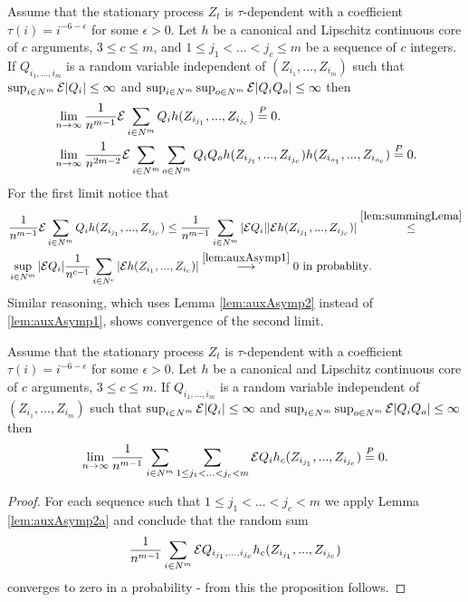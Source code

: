 \begin{lemma}
\label{lem:auxAsymp2a}
Assume that the stationary process $Z_t$ is $\tau$-dependent with a coefficient $\tau(i) = i^{-6-\epsilon}$ for some $\epsilon>0$. Let $h$ be a canonical and Lipschitz continuous core of $c$ arguments, $3 \leq c \leq m$, and $1 \leq j_1 < ...<j_c \leq m$ be a sequence of $c$ integers. If $Q_{i_1,...,i_m}$ is a random variable independent of $(Z_{i_1},...,Z_{i_m})$ such that $\sup_{i \in N^m} \mathcal{E} |Q_i| \leq \infty$ and $\sup_{i \in N^{m}} \sup_{o \in N^m} \mathcal{E} |Q_i Q_o| \leq \infty$  then 
\begin{align}
&\lim_{n \to \infty}\frac{1} {n^{m-1}} \mathcal{E}  \sum_{i \in N^{m}}  Q_i h(Z_{i_{j_1}},...,Z_{i_{j_c}}) \overset{P}{=} 0. \\
&\lim_{n \to \infty}\frac{1} {n^{2m-2}} \mathcal{E}  \sum_{i \in N^{m}} \sum_{o \in N^{m}}  Q_i Q_o h(Z_{i_{j_1}},...,Z_{i_{j_c}}) h(Z_{i_{o_1}},...,Z_{i_{o_c}}) \overset{P}{=} 0. \\
\end{align}
For the first limit notice  that 
\begin{align}
&\frac{1} {n^{m-1}} \mathcal{E}  \sum_{i \in N^{m}}  Q_i h(Z_{i_{j_1}},...,Z_{i_{j_c}}) \leq  \frac{1} {n^{m-1}}  \sum_{i \in N^{m}}  |\mathcal{E} Q_i| |\mathcal{E} h(Z_{i_{j_1}},...,Z_{i_{j_c}})| \overset{ \ref{lem:summingLema}}{\leq} \\
& \sup_{i \in N^m} |\mathcal{E} Q_i|   \frac{1} {n^{c-1}}  \sum_{i \in N^c} |\mathcal{E} h(Z_{i_1},...,Z_{i_c})| \overset{\ref{lem:auxAsymp1}}{\longrightarrow} 0 \text{  in probablity}. 
\end{align}
Similar reasoning, which uses Lemma \ref{lem:auxAsymp2} instead of \ref{lem:auxAsymp1}, shows convergence of the second limit. 
\end{lemma}


\begin{lemma}
\label{lem:higherVstats}
Assume that the stationary process $Z_t$ is $\tau$-dependent with a coefficient $\tau(i) = i^{-6-\epsilon}$ for some $\epsilon>0$. Let $h$ be a canonical and Lipschitz continuous core of $c$ arguments, $3 \leq c \leq m$. If $Q_{i_1,...,i_m}$ is a random variable independent of $(Z_{i_1},...,Z_{i_m})$ such that $\sup_{i \in N^m} \mathcal{E} |Q_i| \leq \infty$ and $\sup_{i \in N^{m}} \sup_{o \in N^m} \mathcal{E} |Q_i Q_o| \leq \infty$  then 
\begin{align}
\lim_{n \to \infty} \frac {1} {n^{m-1}} \sum_{i \in N^m}  \sum_{1 \leq j_1<...<j_c < m} \mathcal{E} Q_i   h_c(Z_{i_{j_1}},...,Z_{i_{j_c}}) \overset{P}{=} 0.
\end{align}
\end{lemma}
\begin{proof}
For each sequence such that  $1 \leq j_1<...<j_c < m$  we apply Lemma \ref{lem:auxAsymp2a} and  conclude that the random sum 
\begin{align}
\frac {1} {n^{m-1}} \sum_{i \in N^m} \mathcal{E} Q_{i_{j_1},...,i_{j_c}}   h_c(Z_{i_{j_1}},...,Z_{i_{j_c}})
\end{align}
converges to zero in a probability - from this the proposition follows.
\end{proof}


